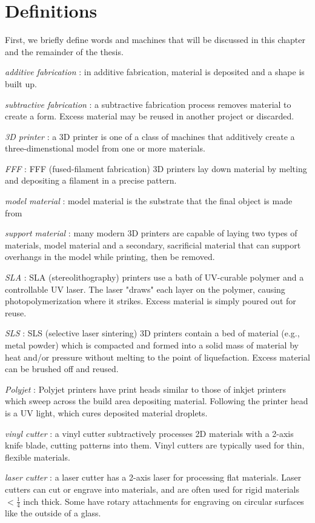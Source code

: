 \section{Definitions}

First, we briefly define words and machines that will be discussed in this chapter and the remainder of the thesis.

\emph{additive fabrication} : in additive fabrication, material is deposited and a shape is built up.

\emph{subtractive fabrication} : a subtractive fabrication process removes material to create a form. Excess material may be reused in another project or discarded.

\emph{3D printer} : a 3D printer is one of a class of machines that additively create a three-dimenstional model from one or more materials.

\emph{FFF} : FFF (fused-filament fabrication) 3D printers lay down material by melting and depositing a filament in a precise pattern.

\emph{model material} : model material is the substrate that the final object is made from

\emph{support material} : many modern 3D printers are capable of laying two types of materials, model material and a secondary, sacrificial material that can support overhangs in the model while printing, then be removed.

\emph{SLA} : SLA (stereolithography) printers use a bath of UV-curable polymer and a controllable UV laser. The laser "draws" each layer on the polymer, causing photopolymerization where it strikes. Excess material is simply poured out for reuse.

\emph{SLS} : SLS (selective laser sintering) 3D printers contain a bed of material (e.g., metal powder) which is compacted and formed into a solid mass of material by heat and/or pressure without melting to the point of liquefaction. Excess material can be brushed off and reused.

\emph{Polyjet} : Polyjet printers have print heads similar to those of inkjet printers which sweep across the build area depositing material. Following the printer head is a UV light, which cures deposited material droplets.

\emph{vinyl cutter} : a vinyl cutter subtractively processes 2D materials with a 2-axis knife blade, cutting patterns into them. Vinyl cutters are typically used for thin, flexible materials.

\emph{laser cutter} : a laser cutter has a 2-axis laser for processing flat materials. Laser cutters can cut or engrave into materials, and are often used for rigid materials $<\frac{1}{4}$ inch thick. Some have rotary attachments for engraving on circular surfaces like the outside of a glass.

